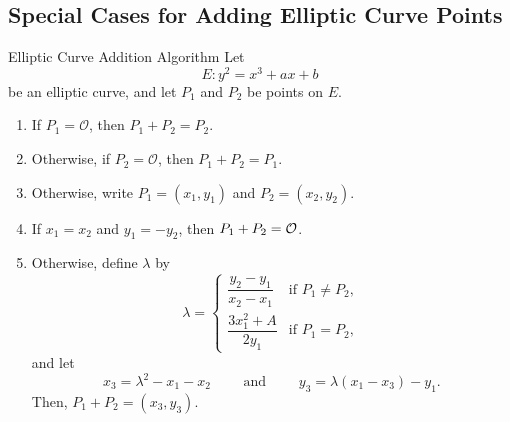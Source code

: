 
\subsection{Special Cases for Adding Elliptic Curve Points}

\begin{theorem}
    {Elliptic Curve Addition Algorithm} Let 
    \[
        E \colon y^{2} = x^{3} + ax + b
    \]
    be an elliptic curve, and let \(P_{1}\) and \(P_{2}\) be points on \(E\). 
    \begin{enumerate}[label=(\alph*)]
        \item If \(P_{1} = \mathcal{O}\), then \(P_{1} + P_{2} = P_{2}\).
        \item Otherwise, if \(P_{2} = \mathcal{O}\), then \(P_{1} + P_{2} = P_{1}\).
        \item Otherwise, write \(P_{1} = (x_{1}, y_{1})\) and \(P_{2} =(x_{2},y_{2})\).
        \item If \(x_{1} = x_{2}\) and \(y_{1} = -y_{2}\), then \(P_{1} + P_{2} = \mathcal{O}\).
        \item Otherwise, define \(\lambda\) by 
        \[\lambda = 
        \begin{cases}
            \dfrac{y_{2} - y_{1}}{x_{2} - x_{1}} & \text{if } P_{1} \ne P_{2}, \\[0.5cm]
            \dfrac{3x_{1}^{2} + A}{2y_{1}} & \text{if } P_{1} = P_{2}, 
        \end{cases}
        \]
        and let 
        \[
        x_{3} = \lambda^{2} - x_{1} - x_{2} \qquad \text{ and } \qquad y_{3} = \lambda (x_{1} - x_{3}) - y_{1}.
        \] 
        Then, \(P_{1} + P_{2} = (x_{3},y_{3})\).
    \end{enumerate}
\end{theorem}

\newcommand{\dydx}{\frac{dy}{dx}}

